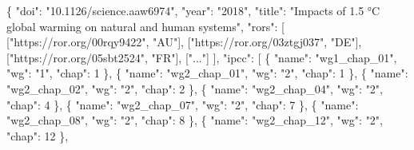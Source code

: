 \documentclass[
]{article}
\newenvironment{Shaded}{}{}
\newcommand{\DataTypeTok}[1]{\textcolor[rgb]{0.56,0.13,0.00}{#1}}
\newcommand{\DecValTok}[1]{\textcolor[rgb]{0.25,0.63,0.44}{#1}}
\newcommand{\FunctionTok}[1]{\textcolor[rgb]{0.02,0.16,0.49}{#1}}
\newcommand{\OtherTok}[1]{\textcolor[rgb]{0.00,0.44,0.13}{#1}}
\newcommand{\StringTok}[1]{\textcolor[rgb]{0.25,0.44,0.63}{#1}}
\begin{document}
\begin{Shaded}
\begin{Highlighting}[]
\FunctionTok{\{}
  \DataTypeTok{"doi"}\FunctionTok{:} \StringTok{"10.1126/science.aaw6974"}\FunctionTok{,}
  \DataTypeTok{"year"}\FunctionTok{:} \StringTok{"2018"}\FunctionTok{,}
  \DataTypeTok{"title"}\FunctionTok{:} \StringTok{"Impacts of 1.5 °C global warming on natural and human systems"}\FunctionTok{,}
  \DataTypeTok{"rors"}\FunctionTok{:} \OtherTok{[}
    \OtherTok{[}\StringTok{"https://ror.org/00rqy9422"}\OtherTok{,} \StringTok{"AU"}\OtherTok{],}
    \OtherTok{[}\StringTok{"https://ror.org/03ztgj037"}\OtherTok{,} \StringTok{"DE"}\OtherTok{],}
    \OtherTok{[}\StringTok{"https://ror.org/05sbt2524"}\OtherTok{,} \StringTok{"FR"}\OtherTok{],}
    \OtherTok{[}\StringTok{"..."}\OtherTok{]}
  \OtherTok{]}\FunctionTok{,}
  \DataTypeTok{"ipcc"}\FunctionTok{:} \OtherTok{[}
    \FunctionTok{\{} \DataTypeTok{"name"}\FunctionTok{:} \StringTok{"wg1\_chap\_01"}\FunctionTok{,} \DataTypeTok{"wg"}\FunctionTok{:} \StringTok{"1"}\FunctionTok{,} \DataTypeTok{"chap"}\FunctionTok{:} \DecValTok{1} \FunctionTok{\}}\OtherTok{,}
    \FunctionTok{\{} \DataTypeTok{"name"}\FunctionTok{:} \StringTok{"wg2\_chap\_01"}\FunctionTok{,} \DataTypeTok{"wg"}\FunctionTok{:} \StringTok{"2"}\FunctionTok{,} \DataTypeTok{"chap"}\FunctionTok{:} \DecValTok{1} \FunctionTok{\}}\OtherTok{,}
    \FunctionTok{\{} \DataTypeTok{"name"}\FunctionTok{:} \StringTok{"wg2\_chap\_02"}\FunctionTok{,} \DataTypeTok{"wg"}\FunctionTok{:} \StringTok{"2"}\FunctionTok{,} \DataTypeTok{"chap"}\FunctionTok{:} \DecValTok{2} \FunctionTok{\}}\OtherTok{,}
    \FunctionTok{\{} \DataTypeTok{"name"}\FunctionTok{:} \StringTok{"wg2\_chap\_04"}\FunctionTok{,} \DataTypeTok{"wg"}\FunctionTok{:} \StringTok{"2"}\FunctionTok{,} \DataTypeTok{"chap"}\FunctionTok{:} \DecValTok{4} \FunctionTok{\}}\OtherTok{,}
    \FunctionTok{\{} \DataTypeTok{"name"}\FunctionTok{:} \StringTok{"wg2\_chap\_07"}\FunctionTok{,} \DataTypeTok{"wg"}\FunctionTok{:} \StringTok{"2"}\FunctionTok{,} \DataTypeTok{"chap"}\FunctionTok{:} \DecValTok{7} \FunctionTok{\}}\OtherTok{,}
    \FunctionTok{\{} \DataTypeTok{"name"}\FunctionTok{:} \StringTok{"wg2\_chap\_08"}\FunctionTok{,} \DataTypeTok{"wg"}\FunctionTok{:} \StringTok{"2"}\FunctionTok{,} \DataTypeTok{"chap"}\FunctionTok{:} \DecValTok{8} \FunctionTok{\}}\OtherTok{,}
    \FunctionTok{\{} \DataTypeTok{"name"}\FunctionTok{:} \StringTok{"wg2\_chap\_12"}\FunctionTok{,} \DataTypeTok{"wg"}\FunctionTok{:} \StringTok{"2"}\FunctionTok{,} \DataTypeTok{"chap"}\FunctionTok{:} \DecValTok{12} \FunctionTok{\}}\OtherTok{,}

\end{Highlighting}
\end{Shaded}
\end{document}
